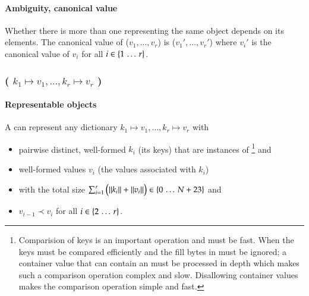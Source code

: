 \paragraph{Ambiguity, canonical value}

Whether there is more than one \DborSequenceValue{} representing the same object depends on its
elements.
The canonical value of \DborSequenceValue{}($v_1, \ldots, v_r$) is
\DborSequenceValue($v_1', \ldots, v_r'$)
where $v_i'$ is the canonical value of $v_i$ for all $i \in \{1 \,\ldots\, r\}$.


\subsubsection{\DborDictionaryValue(\texorpdfstring{%
    $k_1 \mapsto v_1, \ldots, k_r \mapsto v_r$%
}{%
    k1 -> v1, ..., kr -> vr%
})}
\hypertarget{sec:def:DictionaryValue}{}

\paragraph{Representable objects}

A \DborDictionaryValue{} can represent any dictionary $k_1 \mapsto v_1, \ldots, k_r \mapsto v_r$ with
\begin{itemize}
    \item
    pairwise distinct, well-formed $k_i$ (its keys) that are instances of \DborElementaryValue
    \footnote{
        Comparision of keys is an important operation and must be fast.
        When the keys must be compared efficiently and the fill bytes in \DborAllocatorValue*{} must be
        ignored; a container value that can contain an \DborAllocatorValue*{} must be processed in depth
        which makes such a comparison operation complex and slow.
        Disallowing container values makes the comparison operation simple and fast.
    }
    and

    \item
    well-formed values $v_i$ (the values associated with $k_i$)

    \item
    with the total size $\sum_{i = 1}^r \big(\|k_i\| + \|v_i\|\big) \in \{0 \,\ldots\, N + 23\}$ and

    \item
    $v_{i - 1} \prec v_{i}$ for all $i \in \{2 \,\ldots\, r\}$.
\end{itemize}

